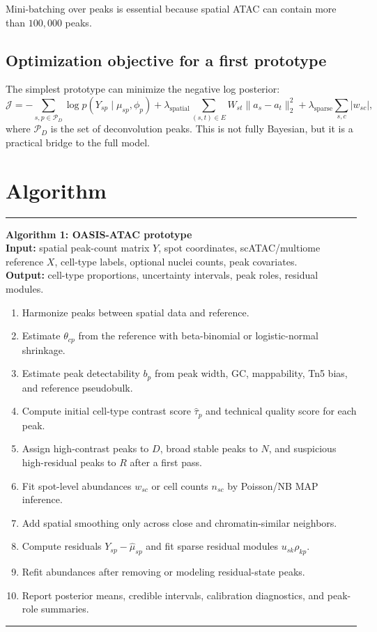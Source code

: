 \documentclass[11pt]{article}
\begin{document}
Mini-batching over peaks is essential because spatial ATAC can contain more than $100,000$ peaks.

\subsection{Optimization objective for a first prototype}

The simplest prototype can minimize the negative log posterior:
\[
\mathcal{J}
=
-\sum_{s,p\in\mathcal{P}_D}\log p(Y_{sp}\mid \mu_{sp},\phi_p)
+\lambda_{\mathrm{spatial}}\sum_{(s,t)\in E}W_{st}\|a_s-a_t\|_2^2
+\lambda_{\mathrm{sparse}}\sum_{s,c}|w_{sc}|,
\]
where $\mathcal{P}_D$ is the set of deconvolution peaks. This is not fully Bayesian, but it is a practical bridge to the full model.

\section{Algorithm}

\begin{center}
\begin{minipage}{0.95\linewidth}
\hrule\vspace{0.5em}
\textbf{Algorithm 1: OASIS-ATAC prototype}\\[0.3em]
\textbf{Input:} spatial peak-count matrix $Y$, spot coordinates, scATAC/multiome reference $X$, cell-type labels, optional nuclei counts, peak covariates.\\
\textbf{Output:} cell-type proportions, uncertainty intervals, peak roles, residual modules.\\[0.3em]
\begin{enumerate}
    \item Harmonize peaks between spatial data and reference.
    \item Estimate $\theta_{cp}$ from the reference with beta-binomial or logistic-normal shrinkage.
    \item Estimate peak detectability $b_p$ from peak width, GC, mappability, Tn5 bias, and reference pseudobulk.
    \item Compute initial cell-type contrast score $\widehat{\tau}_p$ and technical quality score for each peak.
    \item Assign high-contrast peaks to $D$, broad stable peaks to $N$, and suspicious high-residual peaks to $R$ after a first pass.
    \item Fit spot-level abundances $w_{sc}$ or cell counts $n_{sc}$ by Poisson/NB MAP inference.
    \item Add spatial smoothing only across close and chromatin-similar neighbors.
    \item Compute residuals $Y_{sp}-\hat{\mu}_{sp}$ and fit sparse residual modules $u_{sk}\rho_{kp}$.
    \item Refit abundances after removing or modeling residual-state peaks.
    \item Report posterior means, credible intervals, calibration diagnostics, and peak-role summaries.
\end{enumerate}
\vspace{0.3em}\hrule
\end{minipage}
\end{center}
\end{document}
